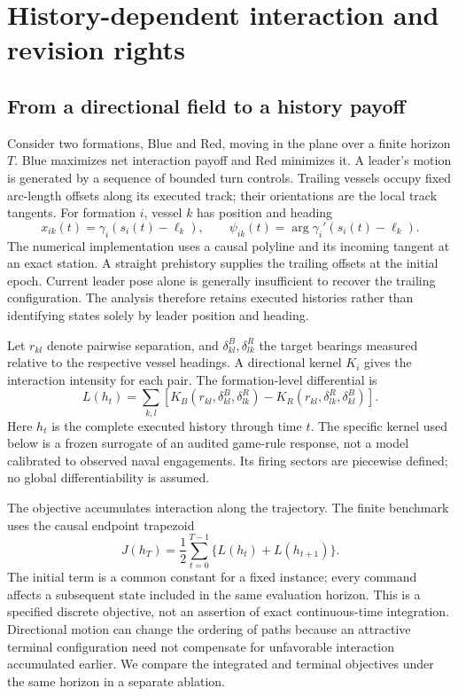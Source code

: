 \section{History-dependent interaction and revision rights}\label{sec:model}

\subsection{From a directional field to a history payoff}
Consider two formations, Blue and Red, moving in the plane over a finite horizon
$T$. Blue maximizes net interaction payoff and Red minimizes it. A leader's
motion is generated by a sequence of bounded turn controls. Trailing vessels
occupy fixed arc-length offsets along its executed track; their orientations
are the local track tangents. For formation $i$, vessel $k$ has position and
heading
\begin{equation}
 x_{ik}(t)=\gamma_i(s_i(t)-\ell_k),\qquad
 \psi_{ik}(t)=\arg\gamma_i'(s_i(t)-\ell_k).
 \label{eq:formation}
\end{equation}
The numerical implementation uses a causal polyline and its incoming tangent
at an exact station. A straight prehistory supplies the trailing offsets at
the initial epoch. Current leader pose alone is generally insufficient to
recover the trailing configuration. The analysis therefore retains executed
histories rather than identifying states solely by leader position and heading.

Let $r_{kl}$ denote pairwise separation, and $\delta^B_{kl},\delta^R_{lk}$
the target bearings measured relative to the respective vessel headings.
A directional kernel $K_i$ gives the interaction intensity for each pair.
The formation-level differential is
\begin{equation}
 L(h_t)=\sum_{k,l}\left[
 K_B(r_{kl},\delta^B_{kl},\delta^R_{lk})-
 K_R(r_{kl},\delta^R_{lk},\delta^B_{kl})\right].
 \label{eq:field}
\end{equation}
Here $h_t$ is the complete executed history through time $t$. The specific
kernel used below is a frozen surrogate of an audited game-rule response,
not a model calibrated to observed naval engagements. Its firing sectors
are piecewise defined; no global differentiability is assumed.

The objective accumulates interaction along the trajectory. The finite
benchmark uses the causal endpoint trapezoid
\begin{equation}
 J(h_T)=\frac12\sum_{t=0}^{T-1}\{L(h_t)+L(h_{t+1})\}.
 \label{eq:payoff}
\end{equation}
The initial term is a common constant for a fixed instance; every command
affects a subsequent state included in the same evaluation horizon. This
is a specified discrete objective, not an assertion of exact continuous-time
integration. Directional motion can change the ordering of paths because
an attractive terminal configuration need not compensate for unfavorable
interaction accumulated earlier. We compare the integrated and terminal
objectives under the same horizon in a separate ablation.


